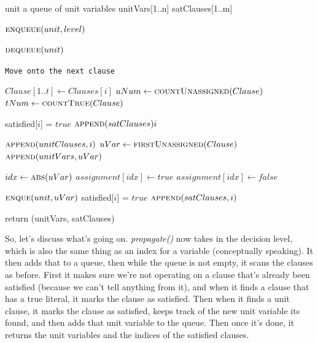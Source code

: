 \begin{algorithm}[H]
\caption{Unit Propagation}\label{alg:14}
\begin{algorithmic}[1]


\State unit \Comment a queue of unit variables
\State unitVars[1..n]
\State satClauses[1..m]

\State $\Call{enqueue}{unit, level}$

    \State $\Call{dequeue}{unit}$

            \texttt{Move onto the next clause}
        \EndIf

        \State $Clause[1..t] \gets Clauses[i]$
        \State $uNum \gets \Call{countUnassigned}{Clause}$
        \State $tNum \gets \Call{countTrue}{Clause}$

            \State satisfied[$i$] = $true$
            \State $\Call{append}{satClauses}{i}$
        \EndIf

            \State $\Call{append}{unitClauses, i}$
            \State $uVar \gets \Call{firstUnassigned}{Clause}$
            \State $\Call{append}{unitVars, uVar}$

            \State $idx \gets \Call{abs}{uVar}$
                \State $assignment[idx] \gets true$
            \Else
                \State $assignment[idx] \gets false$
            \EndIf

            \State $\Call{enque}{unit, uVar}$
            \State satisfied[$i$] = $true$
            \State $\Call{append}{satClauses, i}$
        \EndIf
    \EndFor
\EndWhile

\State return (unitVars, satClauses) 

\EndProcedure
\end{algorithmic}
\end{algorithm}

So, let's discuss what's going on. \textit{propagate()} now takes in the decision level, 
which is also the same thing as an index for a variable (conceptually speaking). It then 
adds that to a queue, then while the queue is not empty, it scans the clauses as before. 
First it makes sure we're not operating on a clause that's already been satisfied 
(because we can't tell anything from it), and when it finds a clause that has a true literal, 
it marks the clause as satisfied. Then when it finds a unit clause, it marks the clause as 
satisfied, keeps track of the new unit variable its found, and then adds that unit variable 
to the queue. Then once it's done, it returns the unit variables and the indices of the satisfied 
clauses.

